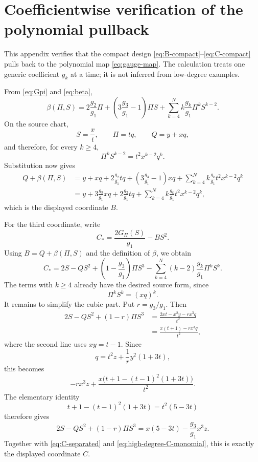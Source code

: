 \section{Coefficientwise verification of the polynomial pullback}
\label{app:gauge-identities}

This appendix verifies that the compact design
\eqref{eq:B-compact}--\eqref{eq:C-compact} pulls back to the polynomial map
\eqref{eq:gauge-map}.  The calculation treats one generic coefficient \(g_k\)
at a time; it is not inferred from low-degree examples.

From \eqref{eq:Gpi} and \eqref{eq:beta},
\begin{equation}
 \beta(\Pi,S)
 =2\frac{g_2}{g_1}\Pi
  +\left(3\frac{g_3}{g_1}-1\right)\Pi S
  +\sum_{k=4}^N k\frac{g_k}{g_1}\Pi^kS^{k-2}.
 \label{eq:beta-expanded}
\end{equation}
On the source chart,
\[
 S=\frac{x}{t},\qquad \Pi=tq,\qquad Q=y+xq,
\]
and therefore, for every $k\geq4$,
\begin{equation}
 \Pi^kS^{k-2}=t^2x^{k-2}q^k.
 \label{eq:high-degree-B-monomial}
\end{equation}
Substitution now gives
\begin{align*}
 Q+\beta(\Pi,S)
 &=y+xq+2\frac{g_2}{g_1}tq
   +\left(3\frac{g_3}{g_1}-1\right)xq
   +\sum_{k=4}^N k\frac{g_k}{g_1}t^2x^{k-2}q^k\\
 &=y+3\frac{g_3}{g_1}xq+2\frac{g_2}{g_1}tq
   +\sum_{k=4}^N k\frac{g_k}{g_1}t^2x^{k-2}q^k,
\end{align*}
which is the displayed coordinate $B$.

For the third coordinate, write
\[
 C_*=\frac{2G_\Pi(S)}{g_1}-BS^2.
\]
Using $B=Q+\beta(\Pi,S)$ and the definition of $\beta$, we obtain
\begin{equation}
 C_*=2S-QS^2+\left(1-\frac{g_3}{g_1}\right)\Pi S^3
 -\sum_{k=4}^N(k-2)\frac{g_k}{g_1}\Pi^kS^k.
 \label{eq:C-separated}
\end{equation}
The terms with $k\geq4$ already have the desired source form, since
\begin{equation}
 \Pi^kS^k=(xq)^k.
 \label{eq:high-degree-C-monomial}
\end{equation}
It remains to simplify the cubic part.  Put $r=g_3/g_1$.  Then
\begin{align*}
 2S-QS^2+(1-r)\Pi S^3
 &=\frac{2xt-x^2y-rx^3q}{t^2}\\
 &=\frac{x(t+1)-rx^3q}{t^2},
\end{align*}
where the second line uses $xy=t-1$.  Since
\[
 q=t^2z+\frac1r y^2(1+3t),
\]
this becomes
\[
 -rx^3z+\frac{x\bigl(t+1-(t-1)^2(1+3t)\bigr)}{t^2}.
\]
The elementary identity
\begin{equation}
 t+1-(t-1)^2(1+3t)=t^2(5-3t)
 \label{eq:cubic-cancellation}
\end{equation}
therefore gives
\[
 2S-QS^2+(1-r)\Pi S^3=x(5-3t)-\frac{g_3}{g_1}x^3z.
\]
Together with \eqref{eq:C-separated} and
\eqref{eq:high-degree-C-monomial}, this is exactly the displayed coordinate
$C$.

